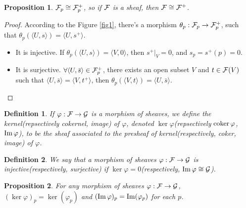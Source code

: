 \documentclass[8pt]{article}
\theoremstyle{plain}
\newtheorem{pro}{Proposition}
\newtheorem{defi}{Definition}
\begin{document}
\begin{pro}
	$\mathcal{F}_p\cong \mathcal{F}^+_p$, so if $\mathcal{F}$ is a sheaf, then $\mathcal{F}\cong \mathcal{F}^+$.
	\label{pro:4}
\end{pro}
\begin{proof}
	According to the Figure \ref{fig1}, there's a morphism $\theta_p:\mathcal{F}_p\to \mathcal{F}^+_p$, such that $\theta_p(\langle U,s\rangle)=\langle U,s^+\rangle$.
	\begin{itemize}
	\item It is injective. If $\theta_p(\langle U,s\rangle)=\langle V,0\rangle$, then $s^+|_V=0$, and $s_p=s^+(p)=0$.

	\item It is surjective. $\forall \langle U,\bar{s}\rangle\in \mathcal{F}^+_p$, there exists an open subset $V$ and $t\in \mathcal{F}(V)$ such that $\langle U,\bar{s}\rangle=\langle V,t^+\rangle$, then $\theta_p(\langle V,t\rangle)=\langle U,\bar{s}\rangle$.
	\end{itemize}
\end{proof}
\begin{defi}
	If $\varphi:\mathcal{F}\to\mathcal{G}$ is a morphism of sheaves, we define the kernel(repsectively cokernel, image) of $\varphi$, denoted $\ker \varphi$(repsectively $\operatorname{coker} \varphi$, $\operatorname{Im} \varphi$), to be the sheaf associated to the presheaf of kernel(respectively, coker, image) of $\varphi$.
\end{defi}
\begin{defi}
	We say that a morphism of sheaves $\varphi:\mathcal{F}\to\mathcal{G}$ is injective(respectively, surjective) if $\ker\varphi=0$(respectively, $\operatorname{Im}\varphi\cong\mathcal{G}$).
\end{defi}
\begin{pro}
	For any morphism of sheaves $\varphi:\mathcal{F}\to\mathcal{G}$, $(\ker \varphi)_p=\ker(\varphi_p)$ and $(\operatorname{Im} \varphi)_p=\operatorname{Im}(\varphi_p)$ for each $p$.
	\label{pro:5}
\end{pro}
\end{document}

